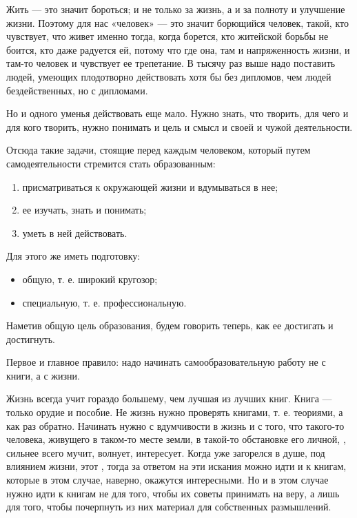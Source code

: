 Жить --- это значит бороться; и не только за жизнь, а и за полноту и улучшение жизни. Поэтому для нас «человек» --- это значит борющийся человек, такой, кто чувствует, что живет именно тогда, когда борется, кто житейской борьбы не боится, кто даже радуется ей, потому что где она, там и напряженность жизни, и там-то человек и чувствует ее трепетание. В тысячу раз выше надо поставить людей, умеющих плодотворно действовать хотя бы без дипломов, чем людей бездейственных, но с дипломами.

Но и одного уменья действовать еще мало. Нужно знать, что творить, для чего и для кого творить, нужно понимать и цель и смысл и своей и чужой деятельности.

Отсюда такие задачи, стоящие перед каждым человеком, который путем самодеятельности стремится стать образованным:
\begin{enumerate}
    \item присматриваться к окружающей жизни и вдумываться в нее;
    \item ее изучать, знать и понимать;
    \item уметь в ней действовать.
\end{enumerate}

Для этого же иметь подготовку:
\begin{itemize}[noitemsep, label=--]
    \item общую, т. е. широкий кругозор;
    \item специальную, т. е. профессиональную.
\end{itemize}
Наметив общую цель образования, будем говорить теперь, как ее достигать и достигнуть.

Первое и главное правило: надо начинать самообразовательную работу не с книги, а с жизни.

Жизнь всегда учит гораздо большему, чем лучшая из лучших книг. Книга --- только орудие и пособие. Не жизнь нужно проверять книгами, т. е. теориями, а как раз обратно. Начинать нужно с вдумчивости в жизнь и с того, что такого-то человека, живущего в таком-то месте земли, в такой-то обстановке его личной, , сильнее всего мучит, волнует, интересует. Когда уже загорелся в душе, под влиянием жизни, этот , тогда за ответом на эти искания можно идти и к книгам, которые в этом случае, наверно, окажутся интересными. Но и в этом случае нужно идти к книгам не для того, чтобы их советы принимать на веру, а лишь для того, чтобы почерпнуть из них материал для собственных размышлений.

